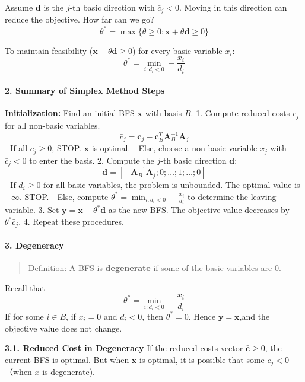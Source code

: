 \documentclass[11pt,a4paper]{article}
\begin{document}
Assume \(\boldsymbol{d}\) is the \(j\)-th basic direction with \(\bar{c}_j < 0\). Moving in this direction can reduce the objective. How far can we go? \[\theta^* = \max \{\theta \geq 0 : \boldsymbol{x} + \theta \boldsymbol{d} \geq 0\}\]

To maintain feasibility (\(\boldsymbol{x} + \theta \boldsymbol{d} \geq 0\)) for every basic variable \(x_i\): \[\theta^* = \min_{i : d_i < 0} -\frac{x_i}{d_i} \]

\paragraph{2. Summary of Simplex Method Steps}\label{summary-of-simplex-method-steps}

\textbf{Initialization:} Find an initial BFS \(\boldsymbol{x}\) with basis \(B\). 1. Compute reduced costs \(\bar{c}_j\) for all non-basic variables. \[\bar{c}_j = \boldsymbol{c}_j - \boldsymbol{c}_B^T \mathbf{A}_B^{-1} \boldsymbol{A}_j\] - If all \(\bar{c}_j \geq 0\), STOP. \(\boldsymbol{x}\) is optimal. - Else, choose a non-basic variable \(x_j\) with \(\bar{c}_j < 0\) to enter the basis. 2. Compute the \(j\)-th basic direction \(\boldsymbol{d}\): \[\boldsymbol{d} = [-\mathbf{A}_B^{-1} \boldsymbol{A}_j; 0; \dots; 1; \dots; 0]\] - If \(d_i \geq 0\) for all basic variables, the problem is unbounded. The optimal value is \(-\infty\). STOP. - Else, compute \(\theta^* = \min_{i : d_i < 0} -\frac{x_i}{d_i}\) to determine the leaving variable. 3. Set \(\boldsymbol{y} = \boldsymbol{x} + \theta^* \boldsymbol{d}\) as the new BFS. The objective value decreases by \(\theta^* \bar{c}_j\). 4. Repeat these procedures.

\paragraph{3. Degeneracy}\label{degeneracy}

\begin{quote}
Definition: A BFS is \textbf{degenerate} if some of the basic variables are \(0\).
\end{quote}

Recall that \[\theta^* = \min_{i : d_i < 0} -\frac{x_i}{d_i} \] If for some \(i \in B\), if \(x_i = 0\) and \(d_i < 0\), then \(\theta^* = 0\). Hence \(\boldsymbol{y} = \boldsymbol{x}\),and the objective value does not change.

\textbf{3.1. Reduced Cost in Degeneracy} If the reduced costs vector \(\bar{\boldsymbol{c}} \geq 0\), the current BFS is optimal. But when \(\boldsymbol{x}\) is optimal, it is possible that some \(\bar{c}_j < 0\) （when \(x\) is degenerate).
\end{document}
